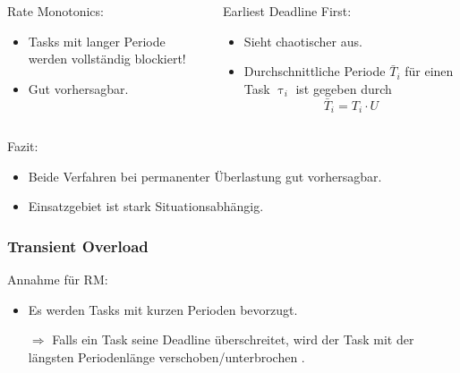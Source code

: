 \begin{frame}{\subsubsecname}
	
	
\end{frame}

\begin{frame}{\subsubsecname}
	\begin{columns}[]
  			\begin{column}{0.5\textwidth}
				Rate Monotonics:
				\begin{itemize}
					\item Tasks mit langer Periode werden vollständig blockiert!
					\item Gut vorhersagbar.
				\end{itemize}

			\end{column}
  			\begin{column}{0.5\textwidth}
  				Earliest Deadline First:
				\begin{itemize}
					\item Sieht chaotischer aus.
					\item Durchschnittliche Periode $\bar{T}_i$ für einen Task $\uptau_i$ ist gegeben durch
						\begin{equation}
							\bar{T}_i=T_i\cdot U
						\end{equation}
				\end{itemize}	
  			\end{column}
	\end{columns}
\end{frame}


\begin{frame}{\subsubsecname}
	Fazit:
	\begin{itemize}
		\item Beide Verfahren bei permanenter Überlastung gut vorhersagbar.
		\item Einsatzgebiet ist stark Situationsabhängig.
	\end{itemize}
\end{frame}

\subsubsection{Transient Overload}
\begin{frame}{\subsubsecname}
	Annahme für RM:
	\begin{itemize}
		\item Es werden Tasks mit kurzen Perioden bevorzugt.\pause
		\item[$\Rightarrow$] Falls ein Task seine Deadline überschreitet, wird der Task mit der längsten Periodenlänge verschoben/unterbrochen	.
	\end{itemize}
\end{frame}

